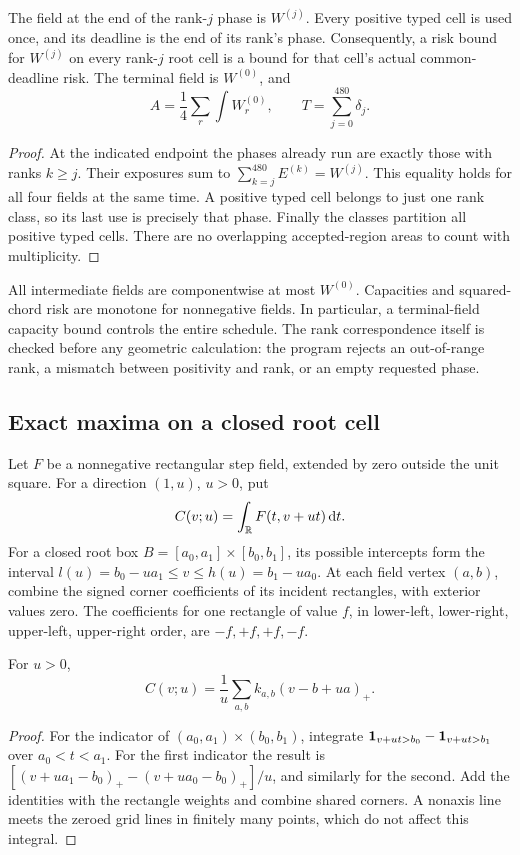 \begin{lemma}\label{lem:reverse}
The field at the end of the rank-\(j\) phase is \(W^{(j)}\).
Every positive typed cell is used once, and its deadline is the end
of its rank's phase. Consequently, a risk bound for \(W^{(j)}\)
on every rank-\(j\) root cell is a bound for that cell's actual
common-deadline risk. The terminal field is \(W^{(0)}\), and
\[
 A=\frac14\sum_r\int W_r^{(0)},\qquad
 T=\sum_{j=0}^{480}\delta_j.
\]
\end{lemma}
\begin{proof}
At the indicated endpoint the phases already run are exactly those
with ranks \(k\ge j\). Their exposures sum to
\(\sum_{k=j}^{480}E^{(k)}=W^{(j)}\). This equality holds for all
four fields at the same time. A positive typed cell belongs to just
one rank class, so its last use is precisely that phase. Finally the
classes partition all positive typed cells. There are no overlapping
accepted-region areas to count with multiplicity.
\end{proof}

All intermediate fields are componentwise at most \(W^{(0)}\).
Capacities and squared-chord risk are monotone for nonnegative fields.
In particular, a terminal-field capacity bound controls the entire
schedule. The rank correspondence itself is checked before any
geometric calculation: the program rejects an out-of-range rank, a
mismatch between positivity and rank, or an empty requested phase.

\subsection{Exact maxima on a closed root cell}
Let \(F\) be a nonnegative rectangular step field, extended by zero
outside the unit square. For a direction \((1,u)\), \(u>0\), put
\[
 C(v;u)=\int_{\mathbb R}F(t,v+ut)\,\mathrm d t.
\]
For a closed root box \(B=[a_0,a_1]\times[b_0,b_1]\), its possible
intercepts form the interval
\(l(u)=b_0-ua_1\le v\le h(u)=b_1-ua_0\).
At each field vertex \((a,b)\), combine the signed corner
coefficients of its incident rectangles, with exterior values zero.
The coefficients for one rectangle of value \(f\), in lower-left,
lower-right, upper-left, upper-right order, are \(-f,+f,+f,-f\).

\begin{lemma}\label{lem:corners}
For \(u>0\),
\begin{equation}\label{eq:corners}
 C(v;u)=\frac1u\sum_{a,b}k_{a,b}(v-b+ua)_+.
\end{equation}
\end{lemma}
\begin{proof}
For the indicator of \((a_0,a_1)\times(b_0,b_1)\), integrate
\(\mathbf 1_{v+ut>b_0}-\mathbf 1_{v+ut>b_1}\) over \(a_0<t<a_1\).
For the first indicator the result is
\([(v+ua_1-b_0)_+-(v+ua_0-b_0)_+]/u\), and similarly for the
second. Add the identities with the rectangle weights and combine
shared corners. A nonaxis line meets the zeroed grid lines in finitely
many points, which do not affect this integral.
\end{proof}

